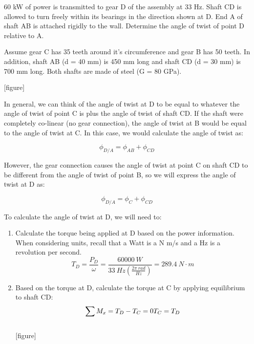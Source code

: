 \documentclass[
  letterpaper,
  DIV=11,
  numbers=noendperiod]{scrreprt}
\theoremstyle{definition}
\theoremstyle{remark}
\begin{document}
\begin{tcolorbox}[enhanced jigsaw, leftrule=.75mm, colbacktitle=quarto-callout-tip-color!10!white, breakable, opacityback=0, colback=white, titlerule=0mm, toprule=.15mm, colframe=quarto-callout-tip-color-frame, coltitle=black, title={Example 6.7}, toptitle=1mm, bottomrule=.15mm, rightrule=.15mm, left=2mm, arc=.35mm, opacitybacktitle=0.6, bottomtitle=1mm]

60 kW of power is transmitted to gear D of the assembly at 33 Hz. Shaft
CD is allowed to turn freely within its bearings in the direction shown
at D. End A of shaft AB is attached rigidly to the wall. Determine the
angle of twist of point D relative to A.

Assume gear C has 35 teeth around it's circumference and gear B has 50
teeth. In addition, shaft AB (d = 40 mm) is 450 mm long and shaft CD (d
= 30 mm) is 700 mm long. Both shafts are made of steel (G = 80 GPa).

{[}figure{]}

\begin{tcolorbox}[enhanced jigsaw, leftrule=.75mm, colbacktitle=quarto-callout-tip-color!10!white, breakable, opacityback=0, colback=white, titlerule=0mm, toprule=.15mm, colframe=quarto-callout-tip-color-frame, coltitle=black, title={Solution}, toptitle=1mm, bottomrule=.15mm, rightrule=.15mm, left=2mm, arc=.35mm, opacitybacktitle=0.6, bottomtitle=1mm]

In general, we can think of the angle of twist at D to be equal to
whatever the angle of twist of point C is plus the angle of twist of
shaft CD. If the shaft were completely co-linear (no gear connection),
the angle of twist at B would be equal to the angle of twist at C. In
this case, we would calculate the angle of twist as:

\[
\phi_{D / A}=\phi_{A B}+\phi_{C D}
\]

However, the gear connection causes the angle of twist at point C on
shaft CD to be different from the angle of twist of point B, so we will
express the angle of twist at D as:

\[
\phi_{D / A}=\phi_C+\phi_{C D}
\]

To calculate the angle of twist at D, we will need to:

\begin{enumerate}
\def\labelenumi{\arabic{enumi}.}
\item
  Calculate the torque being applied at D based on the power
  information. When considering units, recall that a Watt is a N m/s and
  a Hz is a revolution per second.\\
  \[
  T_D=\frac{P_D}{\omega}=\frac{60000{~W}}{33{~Hz}\left(\frac{2\pi{~rad}}{{Hz}}\right)}=289.4{~N}\cdot{m}
  \]
\item
  Based on the torque at D, calculate the torque at C by applying
  equilibrium to shaft CD:\\
  \[
  \sum M_x=T_D-T_C=0 \\ 
  T_C=T_D
  \]\\
  {[}figure{]}


\end{enumerate}
\end{tcolorbox}
\end{tcolorbox}
\end{document}

